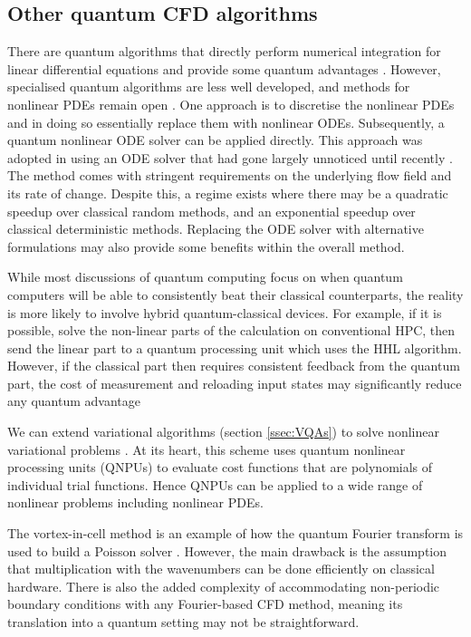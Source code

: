 \documentclass[10pt]{iopart}
\begin{document}
\subsection{Other quantum CFD algorithms}

There are quantum algorithms that directly perform numerical integration for linear differential equations and provide some quantum advantages \cite{Childs2021p,Linden2022}. However, specialised quantum algorithms are less well developed, and methods for nonlinear PDEs remain open \cite{Balducci2022}. 
One approach is to discretise the nonlinear PDEs and in doing so essentially replace them with nonlinear ODEs. Subsequently, a quantum nonlinear ODE solver can be applied directly. This approach was adopted in \cite{Gaitan2020,Gaitan2021} using an ODE solver that had gone largely unnoticed until recently \cite{kacewicz1987optimal}. The method comes with stringent requirements on the underlying flow field and its rate of change. Despite this, a regime exists where there may be a quadratic speedup over classical random methods, and an exponential speedup over classical deterministic methods. Replacing the ODE solver with alternative formulations may also provide some benefits within the overall method.

While most discussions of quantum computing focus on when quantum computers will be able to consistently beat their classical counterparts, the reality is more likely to involve hybrid quantum-classical devices. For example, if it is possible, solve the non-linear parts of the calculation on conventional HPC, then send the linear part to a quantum processing unit which uses the HHL algorithm. However, if the classical part then requires consistent feedback from the quantum part, the cost of measurement and reloading input states may significantly reduce any quantum advantage

We can extend variational algorithms (section \ref{ssec:VQAs}) to solve nonlinear variational problems \cite{Lubasch2020,Jaksch2023}. At its heart, this scheme uses quantum nonlinear processing units (QNPUs) to evaluate cost functions that are polynomials of individual trial functions. Hence QNPUs can be applied to a wide range of nonlinear problems including nonlinear PDEs.

The vortex-in-cell method is an example of how the quantum Fourier transform is used to build a Poisson solver \cite{Steijl2018}. However, the main drawback is the assumption that multiplication with the wavenumbers can be done efficiently on classical hardware. There is also the added complexity of accommodating non-periodic boundary conditions with any Fourier-based CFD method, meaning its translation into a quantum setting may not be straightforward. 
\end{document}
